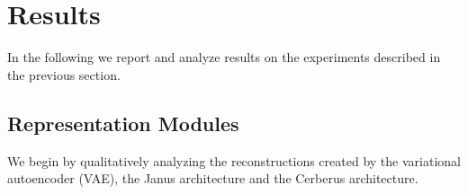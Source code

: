 \section{Results}
\label{sec:results}

In the following we report and analyze results on the experiments described in the previous section. 

\subsection{Representation Modules}

We begin by qualitatively analyzing the reconstructions created by the variational autoencoder (VAE), the Janus architecture and the Cerberus architecture.

